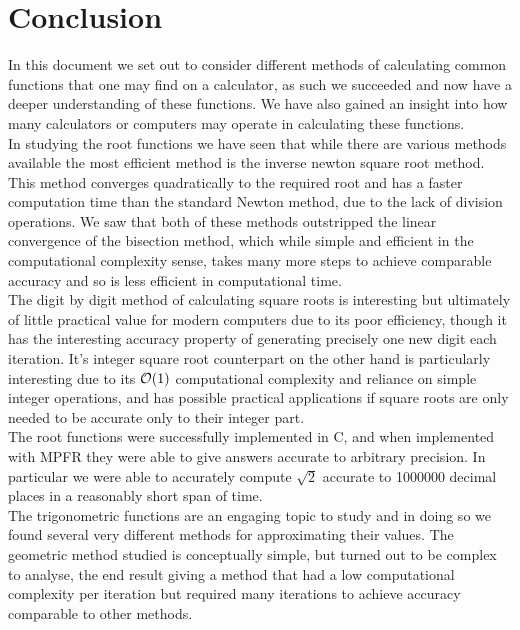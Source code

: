 \section{Conclusion}

In this document we set out to consider different methods of calculating common functions that one may find on a calculator, as such we succeeded and now have a deeper understanding of these functions. We have also gained an insight into how many calculators or computers may operate in calculating these functions.\\

In studying the root functions we have seen that while there are various methods available the most efficient method is the inverse newton square root method. This method converges quadratically to the required root and has a faster computation time than the standard Newton method, due to the lack of division operations. We saw that both of these methods outstripped the linear convergence of the bisection method, which while simple and efficient in the computational complexity sense, takes many more steps to achieve comparable accuracy and so is less efficient in computational time.\\

The digit by digit method of calculating square roots is interesting but ultimately of little practical value for modern computers due to its poor efficiency, though it has the interesting accuracy property of generating precisely one new digit each iteration. It's integer square root counterpart on the other hand is particularly interesting due to its \(\mathcal{O}(1)\) computational complexity and reliance on simple integer operations, and has possible practical applications if square roots are only needed to be accurate only to their integer part.\\

The root functions were successfully implemented in C, and when implemented with MPFR they were able to give answers accurate to arbitrary precision. In particular we were able to accurately compute \(\sqrt{2}\) accurate to 1000000 decimal places in a reasonably short span of time.\\

The trigonometric functions are an engaging topic to study and in doing so we found several very different methods for approximating their values. The geometric method studied is conceptually simple, but turned out to be complex to analyse, the end result giving a method that had a low computational complexity per iteration but required many iterations to achieve accuracy comparable to other methods.\\

